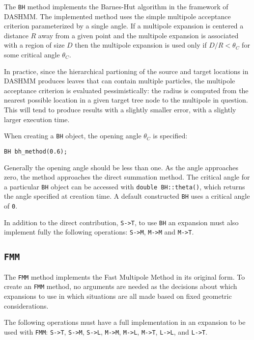 The \texttt{BH} method implements the Barnes-Hut algorithm in the framework of
DASHMM. The implemented method uses the simple multipole acceptance criterion
parameterized by a single angle. If a multipole expansion is centered a
distance $R$ away from a given point and the multipole expansion is
associated with a region of size $D$ then the multipole expansion is used
only if $D/R < \theta_C$ for some critical angle $\theta_C$.

In practice, since the
hierarchical partioning of the source and target locations in DASHMM produces
leaves that can contain multiple particles, the multipole acceptance criterion
is evaluated pessimistically: the radius is computed from the nearest possible
location in a given target tree node to the multipole in question. This will
tend to produce results with a slightly smaller error, with a slightly larger
execution time.

When creating a \texttt{BH} object, the opening angle $\theta_C$ is specified:

\begin{verbatim}
BH bh_method(0.6);
\end{verbatim}

\noindent Generally the opening angle should be less than one. As the
angle approaches
zero, the method approaches the direct summation method. The critical angle
for a particular \texttt{BH} object can be accessed with
\texttt{double BH::theta()}, which returns the angle specified at creation
time. A default constructed \texttt{BH} uses a critical angle of \texttt{0}.

In addition to the direct contribution, \texttt{S->T}, to use \texttt{BH} an
expansion must also implement fully the following operations: \texttt{S->M},
\texttt{M->M} and \texttt{M->T}.

\subsection{\texttt{FMM}}

The \texttt{FMM} method implements the Fast Multipole Method in its original form.
To create an \texttt{FMM} method, no arguments are needed as the decisions about
which expansions to use in which situations are all made based on fixed
geometric considerations.

The following operations must have a full implementation in an expansion to be
used with \texttt{FMM}: \texttt{S->T}, \texttt{S->M}, \texttt{S->L},
\texttt{M->M}, \texttt{M->L}, \texttt{M->T}, \texttt{L->L}, and \texttt{L->T}.

